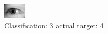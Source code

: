 \begin{figure}[h!]
\begin{center}
\includegraphics[width=0.60\columnwidth]{figures/ID3161_class_3_target_4.png}
\end{center}
\caption{ Classification: 3 actual target: 4}
\label{fig:ID3161_class_3_target_4}
\end{figure}
